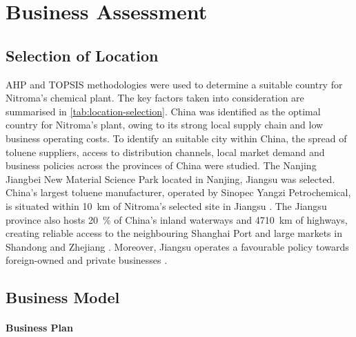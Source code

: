 \section{Business Assessment}
\label{sec:economics}
\subsection{Selection of Location} 
AHP and TOPSIS methodologies were used to determine a suitable country for Nitroma’s chemical plant. The key factors taken into consideration are summarised in \cref{tab:location-selection}. China was identified as the optimal country for Nitroma's plant, owing to its strong local supply chain and low business operating costs. To identify an suitable city within China, the spread of toluene suppliers, access to distribution channels, local market demand and business policies across the provinces of China were studied. The Nanjing Jiangbei New Material Science Park located in Nanjing, Jiangsu was selected. China’s largest toluene manufacturer, operated by Sinopec Yangzi Petrochemical, is situated within \SI{10}{\km} of Nitroma’s selected site in Jiangsu \cite{}. The Jiangsu province also hosts \SI{20}{\percent} of China’s inland waterways and \SI{4710}{\km} of highways, creating reliable access to the neighbouring Shanghai Port and large markets in Shandong and Zhejiang \cite{britannica_jiangsu_nodate}. Moreover, Jiangsu operates a favourable policy towards foreign-owned and private businesses \cite{hktdc_sourcing_market_2008}. 


\subsection{Business Model} 
\paragraph{Business Plan}

